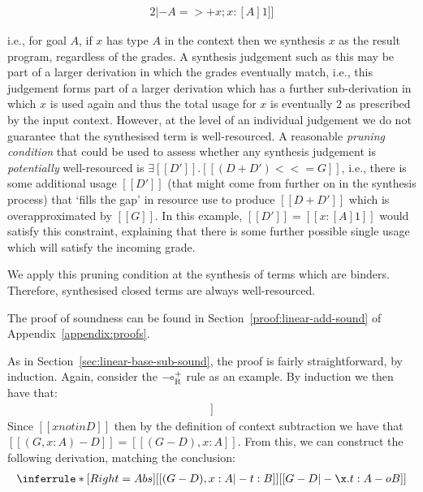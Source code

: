 \begin{align*}
[[ x : [A] 2 |- A =>+ x ; x : [A] 1 ]]
\end{align*}

i.e., for goal $A$, if $x$ has type $A$ in the context then we synthesis $x$ as
the result program, regardless of the grades. A synthesis judgement such as this
may be part of a larger derivation in which the grades eventually match, i.e.,
this judgement forms part of a larger derivation which has a further
sub-derivation in which $x$ is used again and thus the total usage for $x$ is
eventually $2$ as prescribed by the input context. However, at the level of an
individual judgement we do not guarantee that the synthesised term is
well-resourced. A reasonable \emph{pruning condition} that could be used to
assess whether any synthesis judgement is \emph{potentially} well-resourced is
$\exists [[ D' ]] . [[ (D + D') <<= G ]]$, i.e., there is some additional usage
$[[ D' ]]$ (that might come from further on in the synthesis process) that
`fills the gap' in resource use to produce $[[ D + D' ]]$ which is
overapproximated by $[[ G ]]$. In this example, $[[ D' ]] = [[ x : [A] 1 ]]$
would satisfy this constraint, explaining that there is some further possible
single usage which will satisfy the incoming grade. 

We apply this pruning condition at the synthesis of terms which are binders. 
Therefore, synthesised closed terms are always well-resourced.

The proof of soundness can be found in Section~\ref{proof:linear-add-sound} of
Appendix~\ref{appendix:proofs}.

As in Section~\ref{sec:linear-base-sub-sound}, the proof is fairly
straightforward, by induction. Again, consider the $\multimap_\textsc{R}^+$ rule 
as an example. By induction we then have that:
%
\begin{align*}
  [[ (G, x : A) - D |- t : B ]]
\end{align*}
%
Since $[[x notin D]]$ then by the definition of context
subtraction we have that $[[ (G, x : A) - D ]] = [[ (G - D), x : A ]]$.
From this, we can construct the following derivation, matching the
conclusion:
%
\begin{align*}
\inferrule*[Right=Abs]
{[[ (G - D) , x : A |- t : B]]}{[[ G - D |- \x. t : A -o B ]]}
\end{align*}

